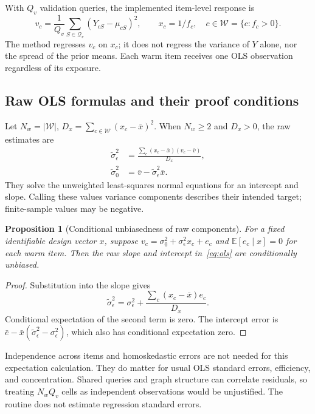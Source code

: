 \documentclass[11pt,a4paper]{article}
\newtheorem{proposition}[theorem]{Proposition}
\theoremstyle{remark}
\newcommand{\E}{\mathbb{E}}
\begin{document}
With $Q_v$ validation queries, the implemented item-level response is
\begin{equation}
 v_c=\frac1{Q_v}\sum_{S\in\mathcal Q_v}(Y_{cS}-\mu_{cS})^2,
 \qquad x_c=1/f_c,\quad c\in\mathcal W=\{c:f_c>0\}.
 \label{eq:responses}
\end{equation}
The method regresses $v_c$ on $x_c$; it does not regress the variance of
$Y$ alone, nor the spread of the prior means. Each warm item receives
one OLS observation regardless of its exposure.

\subsection{Raw OLS formulas and their proof conditions}
Let $N_w=|\mathcal W|$, $D_x=\sum_{c\in\mathcal W}(x_c-\bar x)^2$.
When $N_w\geq2$ and $D_x>0$, the raw estimates are
\begin{align}
 \widetilde\sigma_\epsilon^2
   &=\frac{\sum_c(x_c-\bar x)(v_c-\bar v)}{D_x},\\
 \widetilde\sigma_0^2&=\bar v-\widetilde\sigma_\epsilon^2\bar x.
 \label{eq:ols}
\end{align}
They solve the unweighted least-squares normal equations for an intercept
and slope. Calling these values variance components describes their
intended target; finite-sample values may be negative.

\begin{proposition}[Conditional unbiasedness of raw components]
For a fixed identifiable design vector $x$, suppose
$v_c=\sigma_0^2+\sigma_\epsilon^2x_c+e_c$ and
$\E[e_c\mid x]=0$ for each warm item. Then the raw slope and intercept
in~\eqref{eq:ols} are conditionally unbiased.
\end{proposition}
\begin{proof}
Substitution into the slope gives
\begin{equation}
 \widetilde\sigma_\epsilon^2
 =\sigma_\epsilon^2+\frac{\sum_c(x_c-\bar x)e_c}{D_x}.
\end{equation}
Conditional expectation of the second term is zero. The intercept error
is $\bar e-\bar x(\widetilde\sigma_\epsilon^2-\sigma_\epsilon^2)$,
which also has conditional expectation zero.
\end{proof}
Independence across items and homoskedastic errors are not needed for this
expectation calculation. They do matter for usual OLS standard errors,
efficiency, and concentration. Shared queries and graph structure can
correlate residuals, so treating $N_wQ_v$ cells as independent observations
would be unjustified. The routine does not estimate regression standard
errors.
\end{document}
